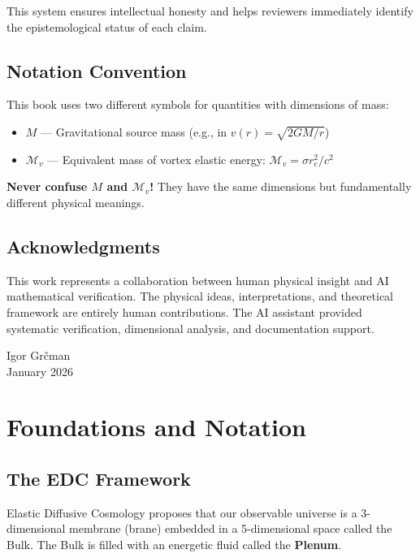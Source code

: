 \documentclass[12pt,a4paper,openany]{book}
\theoremstyle{definition}
\theoremstyle{plain}
\theoremstyle{remark}
\newcommand{\Mv}{\mathcal{M}_v}           %
\newcommand{\re}{r_e}                      %
\begin{document}
This system ensures intellectual honesty and helps reviewers immediately identify the epistemological status of each claim.

\section*{Notation Convention}

\begin{warningbox}
This book uses two different symbols for quantities with dimensions of mass:
\begin{itemize}
    \item $M$ — Gravitational source mass (e.g., in $v(r) = \sqrt{2GM/r}$)
    \item $\Mv$ — Equivalent mass of vortex elastic energy: $\Mv = \sigma \re^2/c^2$
\end{itemize}
\textbf{Never confuse $M$ and $\Mv$!} They have the same dimensions but fundamentally different physical meanings.
\end{warningbox}

\section*{Acknowledgments}

This work represents a collaboration between human physical insight and AI mathematical verification. The physical ideas, interpretations, and theoretical framework are entirely human contributions. The AI assistant provided systematic verification, dimensional analysis, and documentation support.

\vspace{1cm}
\hfill Igor Grčman\\
\hfill January 2026

\chapter{Foundations and Notation}

\section{The EDC Framework}

Elastic Diffusive Cosmology proposes that our observable universe is a 3-dimensional membrane (brane) embedded in a 5-dimensional space called the Bulk. The Bulk is filled with an energetic fluid called the \textbf{Plenum}.
\end{document}
